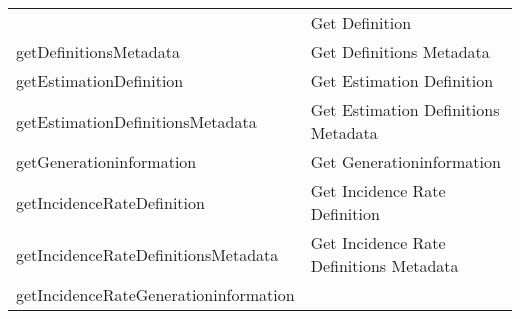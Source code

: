 \documentclass[
]{article}
\begin{document}
\begin{longtable}[]{@{}ll@{}}
\begin{minipage}[t]{0.46\columnwidth}
\end{minipage} & \begin{minipage}[t]{0.48\columnwidth}\raggedright
Get Definition\strut
\end{minipage}\tabularnewline
\begin{minipage}[t]{0.46\columnwidth}\raggedright
getDefinitionsMetadata\strut
\end{minipage} & \begin{minipage}[t]{0.48\columnwidth}\raggedright
Get Definitions Metadata\strut
\end{minipage}\tabularnewline
\begin{minipage}[t]{0.46\columnwidth}\raggedright
getEstimationDefinition\strut
\end{minipage} & \begin{minipage}[t]{0.48\columnwidth}\raggedright
Get Estimation Definition\strut
\end{minipage}\tabularnewline
\begin{minipage}[t]{0.46\columnwidth}\raggedright
getEstimationDefinitionsMetadata\strut
\end{minipage} & \begin{minipage}[t]{0.48\columnwidth}\raggedright
Get Estimation Definitions Metadata\strut
\end{minipage}\tabularnewline
\begin{minipage}[t]{0.46\columnwidth}\raggedright
getGenerationinformation\strut
\end{minipage} & \begin{minipage}[t]{0.48\columnwidth}\raggedright
Get Generationinformation\strut
\end{minipage}\tabularnewline
\begin{minipage}[t]{0.46\columnwidth}\raggedright
getIncidenceRateDefinition\strut
\end{minipage} & \begin{minipage}[t]{0.48\columnwidth}\raggedright
Get Incidence Rate Definition\strut
\end{minipage}\tabularnewline
\begin{minipage}[t]{0.46\columnwidth}\raggedright
getIncidenceRateDefinitionsMetadata\strut
\end{minipage} & \begin{minipage}[t]{0.48\columnwidth}\raggedright
Get Incidence Rate Definitions Metadata\strut
\end{minipage}\tabularnewline
\begin{minipage}[t]{0.46\columnwidth}\raggedright
getIncidenceRateGenerationinformation\strut

\end{minipage}
\end{longtable}
\end{document}
